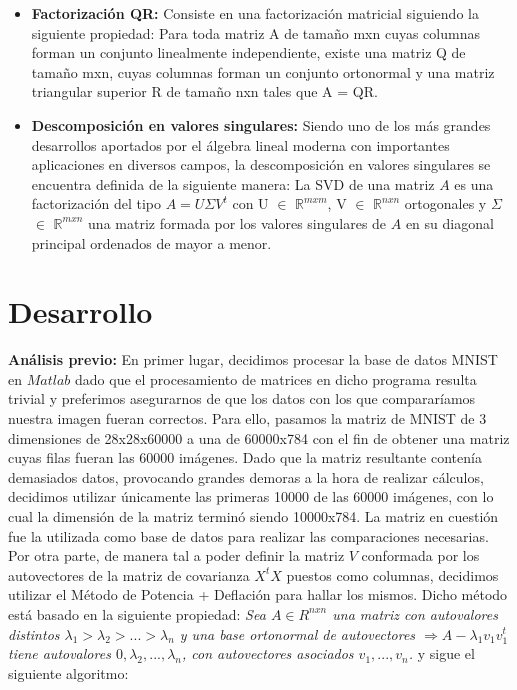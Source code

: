 \documentclass[10pt, a4paper]{article}
\begin{document}
\begin{itemize}
\item {\textbf{Factorización QR:}} Consiste en una factorización matricial siguiendo la siguiente propiedad: Para toda matriz A de tamaño mxn cuyas columnas forman un conjunto linealmente independiente, existe una matriz Q de tamaño mxn, cuyas columnas forman un conjunto ortonormal y una matriz triangular superior R de tamaño nxn tales que A = QR.
\item {\textbf{Descomposición en valores singulares:}} Siendo uno de los más grandes desarrollos aportados por el álgebra lineal moderna con importantes aplicaciones en diversos campos, la descomposición en valores singulares se encuentra definida de la siguiente manera:\newline
La SVD de una matriz $A$ es una factorización del tipo $A = U \Sigma V^t$ con U $\in$ $\mathbb{R}^{mxm}$,  V $\in$ $\mathbb{R}^{nxn}$ ortogonales y $\Sigma$ $\in$ $\mathbb{R}^{mxn}$ una matriz formada por los valores singulares de $A$ en su diagonal principal ordenados de mayor a menor.
 
\end{itemize}

\section{Desarrollo}

\large{\textbf{An\'alisis previo:}}
En primer lugar, decidimos procesar la base de datos MNIST en $Matlab$ dado que el procesamiento de matrices en dicho programa resulta trivial y preferimos asegurarnos de que los datos con los que compararíamos nuestra imagen fueran correctos. Para ello, pasamos la matriz de MNIST de 3 dimensiones de 28x28x60000 a una de 60000x784 con el fin de obtener una matriz cuyas filas fueran las 60000 imágenes. Dado que la matriz resultante contenía demasiados datos, provocando grandes demoras a la hora de realizar cálculos, decidimos utilizar únicamente las primeras 10000 de las 60000 imágenes, con lo cual la dimensión de la matriz terminó siendo 10000x784. La matriz en cuestión fue la utilizada como base de datos para realizar las comparaciones necesarias.\newline
Por otra parte, de manera tal a poder definir la matriz $V$ conformada por los autovectores de la matriz de covarianza $X^tX$ puestos como columnas, decidimos utilizar el Método de Potencia + Deflación para hallar los mismos. Dicho método está basado en la siguiente propiedad:\newline
\newline
\textit{Sea $A \in R^{nxn}$ una matriz con autovalores distintos $\lambda_{1} > \lambda_{2} > ... > \lambda_{n}$ y una base ortonormal de autovectores $\Rightarrow A - \lambda_{1} v_{1} v_{1}^t$ tiene autovalores $0, \lambda_{2}, ..., \lambda_{n}$, con autovectores asociados $v_{1}, ..., v_{n}$.}\newline
\newline
y sigue el siguiente algoritmo:\newline
\end{document}
